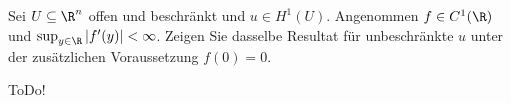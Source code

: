 
\begin{exercise}

Sei $U \subseteq \R^n$ offen und beschränkt und $u \in H^1(U)$.
Angenommen $f \in C^1(\R)$ und $\sup_{y \in \R} |f^\prime(y)| < \infty$.
Zeigen Sie dasselbe Resultat für unbeschränkte $u$ unter der zusätzlichen Voraussetzung $f(0) = 0$.

\end{exercise}


\begin{solution}

ToDo!

\end{solution}

